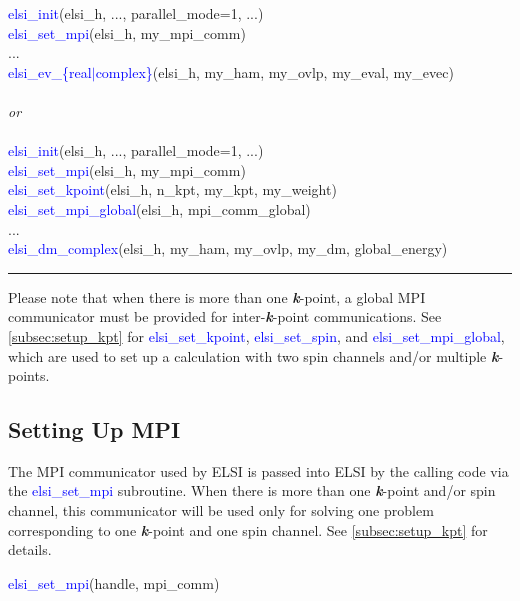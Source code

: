 \documentclass{report}
\begin{document}
\begin{algorithm}[H]
\textcolor{blue}{elsi\_init}(elsi\_h, ..., parallel\_mode=1, ...)\\
\textcolor{blue}{elsi\_set\_mpi}(elsi\_h, my\_mpi\_comm)\\
...\\
\textcolor{blue}{elsi\_ev\_\{real$\vert$complex\}}(elsi\_h, my\_ham, my\_ovlp, my\_eval, my\_evec)\\
~\\
\textit{or}\\
~\\
\textcolor{blue}{elsi\_init}(elsi\_h, ..., parallel\_mode=1, ...)\\
\textcolor{blue}{elsi\_set\_mpi}(elsi\_h, my\_mpi\_comm)\\
\textcolor{blue}{elsi\_set\_kpoint}(elsi\_h, n\_kpt, my\_kpt, my\_weight)\\
\textcolor{blue}{elsi\_set\_mpi\_global}(elsi\_h, mpi\_comm\_global)\\
...\\
\textcolor{blue}{elsi\_dm\_complex}(elsi\_h, my\_ham, my\_ovlp, my\_dm, global\_energy)\\
\end{algorithm}

\noindent\rule{18cm}{0.4pt}

\bigskip
Please note that when there is more than one \textbf{\textit{k}}-point, a global MPI communicator must be provided for inter-\textbf{\textit{k}}-point communications.  See \ref{subsec:setup_kpt} for \textcolor{blue}{elsi\_set\_kpoint}, \textcolor{blue}{elsi\_set\_spin}, and \textcolor{blue}{elsi\_set\_mpi\_global}, which are used to set up a calculation with two spin channels and/or multiple \textbf{\textit{k}}-points.

\subsection{Setting Up MPI}
\label{subsec:setup_mpi}
The MPI communicator used by ELSI is passed into ELSI by the calling code via the \textcolor{blue}{elsi\_set\_mpi} subroutine.  When there is more than one \textbf{\textit{k}}-point and/or spin channel, this communicator will be used only for solving one problem corresponding to one \textbf{\textit{k}}-point and one spin channel.  See \ref{subsec:setup_kpt} for details.\\

\begin{labeling}{\hspace{6cm}}
\item [\hspace{0.3cm} \textcolor{blue}{elsi\_set\_mpi}(handle, mpi\_comm)]
\end{labeling}
\end{document}
